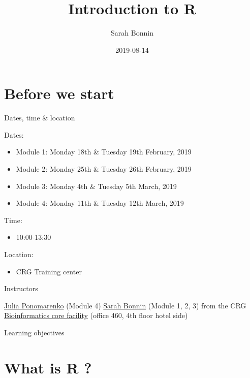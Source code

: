 \documentclass[]{book}
\title{Introduction to R}
\author{Sarah Bonnin}
\date{2019-08-14}
\providecommand{\tightlist}{%
  \setlength{\itemsep}{0pt}\setlength{\parskip}{0pt}}
\begin{document}
\maketitle

{
\setcounter{tocdepth}{1}
\tableofcontents
}
\chapter{Before we start}\label{before-we-start}

Dates, time \& location

Dates:

\begin{itemize}
\tightlist
\item
  Module 1: Monday 18th \& Tuesday 19th February, 2019
\item
  Module 2: Monday 25th \& Tuesday 26th February, 2019
\item
  Module 3: Monday 4th \& Tuesday 5th March, 2019
\item
  Module 4: Monday 11th \& Tuesday 12th March, 2019
\end{itemize}

Time:

\begin{itemize}
\tightlist
\item
  10:00-13:30 
\end{itemize}

Location:

\begin{itemize}
\tightlist
\item
  CRG Training center
\end{itemize}

Instructors

\href{mailto:julia.ponomarenko@crg.eu}{Julia Ponomarenko} (Module 4)
\href{mailto:sarah.bonnin@crg.eu}{Sarah Bonnin} (Module 1, 2, 3) from
the CRG \href{https://biocore.crg.eu/}{Bioinformatics core facility}
(office 460, 4th floor hotel side)

Learning objectives

\chapter{What is R ?}\label{what-is-r}
\end{document}
